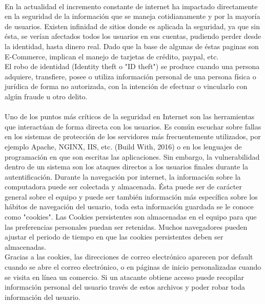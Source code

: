 \documentclass[12pt, a4paper, titlepage]{article}
\begin{document}
		\paragraph{}
		En la actualidad el incremento constante de internet ha impactado directamente en la seguridad de la información que se maneja cotidianamente y por la mayoría de usuarios. Existen infinidad de sitios donde es aplicada la seguridad, ya que sin ésta, se verían afectados todos los usuarios en sus cuentas, pudiendo perder desde la identidad, hasta dinero real. Dado que la base de algunas de éstas paginas son E-Commerce, implican el manejo de tarjetas de crédito, paypal, etc. \\
		El robo de identidad (Identity theft o "ID theft") se produce cuando una persona adquiere, transfiere, posee o utiliza información personal de una persona física o jurídica de forma no autorizada, con la intención de efectuar o vincularlo con algún fraude u otro delito. \cite{refRoboIdentidad}
		\paragraph{}
		Uno de los puntos más críticos de la seguridad en Internet son las herramientas que interactúan de forma directa con los usuarios. Es común escuchar sobre fallas en los sistemas de protección de los servidores más frecuentemente utilizados, por ejemplo Apache, NGINX, IIS, etc. (Build With, 2016) o en los lenguajes de programación en que son escritas las aplicaciones.\cite{refSeguridadWeb} Sin embargo, la vulnerabilidad dentro de un sistema son los ataques directos a los usuarios finales durante la autentificación.
		\newpage
		Durante la navegación por internet, la información sobre la computadora puede ser colectada y almacenada. Ésta puede ser de carácter general sobre el equipo y puede ser también información más específica sobre los hábitos de  navegación del usuario, toda esta información guardada se le conoce como "cookies". 
		Las Cookies persistentes son almacenadas en el equipo para que las preferencias personales puedan ser retenidas. Muchos navegadores pueden ajustar el periodo de tiempo en que las cookies persistentes deben ser almacenadas. \\
		Gracias a las cookies, las direcciones de correo electrónico aparecen por default cuando se abre el correo electrónico, o en páginas de inicio personalizadas cuando se visita en línea un comercio. Si un atacante obtiene acceso puede recopilar información personal del usuario través de estos archivos y poder robar toda información del usuario.
\end{document}
